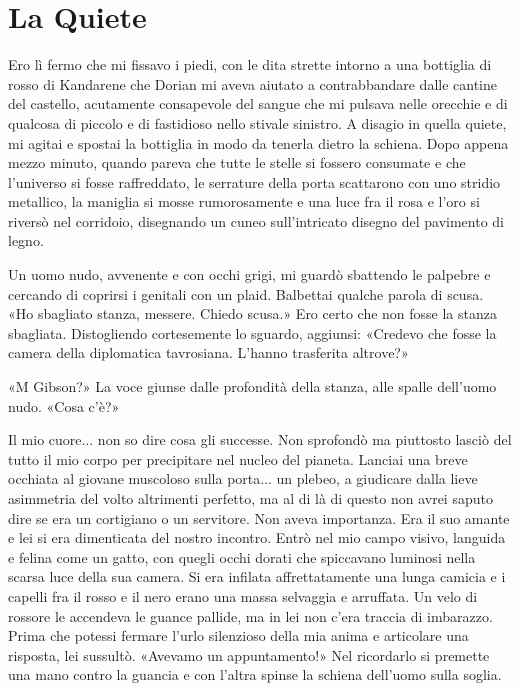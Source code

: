 \chapter{La Quiete}

Ero lì fermo che mi fissavo i piedi, con le dita strette intorno a una
bottiglia di rosso di Kandarene che Dorian mi aveva aiutato a
contrabbandare dalle cantine del castello, acutamente consapevole del
sangue che mi pulsava nelle orecchie e di qualcosa di piccolo e di
fastidioso nello stivale sinistro. A disagio in quella quiete, mi agitai
e spostai la bottiglia in modo da tenerla dietro la schiena. Dopo appena
mezzo minuto, quando pareva che tutte le stelle si fossero consumate e
che l'universo si fosse raffreddato, le serrature della porta scattarono
con uno stridio metallico, la maniglia si mosse rumorosamente e una luce
fra il rosa e l'oro si riversò nel corridoio, disegnando un cuneo
sull'intricato disegno del pavimento di legno.

Un uomo nudo, avvenente e con occhi grigi, mi guardò sbattendo le
palpebre e cercando di coprirsi i genitali con un plaid. Balbettai
qualche parola di scusa. «Ho sbagliato stanza, messere. Chiedo scusa.»
Ero certo che non fosse la stanza sbagliata. Distogliendo cortesemente
lo sguardo, aggiunsi: «Credevo che fosse la camera della diplomatica
tavrosiana. L'hanno trasferita altrove?»

«M Gibson?» La voce giunse dalle profondità della stanza, alle spalle
dell'uomo nudo. «Cosa c'è?»

Il mio cuore... non so dire cosa gli successe. Non sprofondò ma
piuttosto lasciò del tutto il mio corpo per precipitare nel nucleo del
pianeta. Lanciai una breve occhiata al giovane muscoloso sulla porta...
un plebeo, a giudicare dalla lieve asimmetria del volto altrimenti
perfetto, ma al di là di questo non avrei saputo dire se era un
cortigiano o un servitore. Non aveva importanza. Era il suo amante e lei
si era dimenticata del nostro incontro. Entrò nel mio campo visivo,
languida e felina come un gatto, con quegli occhi dorati che spiccavano
luminosi nella scarsa luce della sua camera. Si era infilata
affrettatamente una lunga camicia e i capelli fra il rosso e il nero
erano una massa selvaggia e arruffata. Un velo di rossore le accendeva
le guance pallide, ma in lei non c'era traccia di imbarazzo. Prima che
potessi fermare l'urlo silenzioso della mia anima e articolare una
risposta, lei sussultò. «Avevamo un appuntamento!» Nel ricordarlo si
premette una mano contro la guancia e con l'altra spinse la schiena
dell'uomo sulla soglia.

